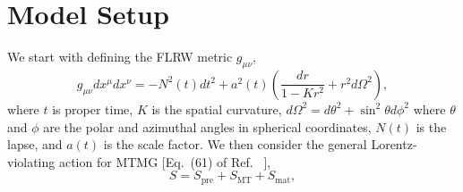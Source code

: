 \documentclass[prd,twocolumn,aps,psfig,nofootinbib,nobibnotes,superscriptaddress,preprintnumbers,times]{revtex4-2}
\begin{document}
\section{Model Setup}\label{sec:setup}
We start with defining the FLRW metric $g_{\mu\nu}$,
\begin{equation}\label{eqn:metric}
    g_{\mu\nu}dx^{\mu} dx^{\nu} = -N^2(t)dt^2 +a^2(t)\left(\frac{dr}{1-Kr^2} + r^2 d\Omega^2\right),
\end{equation}
where $t$ is proper time, $K$ is the spatial curvature, $d\Omega^2 = d\theta^2 + \sin^2\theta d\phi^2$ where $\theta$ and $\phi$ are the polar and azimuthal angles in spherical coordinates, $N(t)$ is the lapse, and $a(t)$ is the scale factor. We then consider the general Lorentz-violating action for MTMG [Eq.\ (61) of Ref.\ \cite{DeFelice:2015moy} ],
\begin{equation}\label{eqn:action}
    S = S_{\text{pre}} + S_{\text{MT}} + S_{\text{mat}},
\end{equation}
\end{document}
